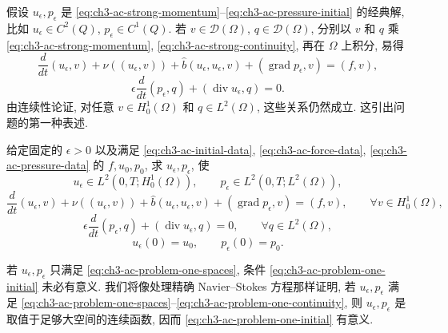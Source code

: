 \hypertarget{chapter-03-page-304}{}
假设 $u_\epsilon,p_\epsilon$ 是 \eqref{eq:ch3-ac-strong-momentum}--\eqref{eq:ch3-ac-pressure-initial} 的经典解, 比如 $u_\epsilon\in C^2(Q)$, $p_\epsilon\in C^1(Q)$. 若 $v\in\mathcal D(\Omega)$, $q\in\mathcal D(\Omega)$, 分别以 $v$ 和 $q$ 乘 \eqref{eq:ch3-ac-strong-momentum}, \eqref{eq:ch3-ac-strong-continuity}, 再在 $\Omega$ 上积分, 易得
\[
\frac d{dt}(u_\epsilon,v)+\nu((u_\epsilon,v))
+\widehat b(u_\epsilon,u_\epsilon,v)
+(\operatorname{grad}p_\epsilon,v)=(f,v),
\]
\[
\epsilon\frac d{dt}(p_\epsilon,q)+(\operatorname{div}u_\epsilon,q)=0.
\]
由连续性论证, 对任意 $v\in H_0^1(\Omega)$ 和 $q\in L^2(\Omega)$, 这些关系仍然成立. 这引出问题的第一种表述.

\MBProblemHeading\label{prob:ch3-ac-weak-formulation-one}
给定固定的 $\epsilon>0$ 以及满足 \eqref{eq:ch3-ac-initial-data}, \eqref{eq:ch3-ac-force-data}, \eqref{eq:ch3-ac-pressure-data} 的 $f,u_0,p_0$, 求 $u_\epsilon,p_\epsilon$, 使
\begin{equation}
u_\epsilon\in L^2(0,T;H_0^1(\Omega)),
\qquad p_\epsilon\in L^2(0,T;L^2(\Omega)),
\label{eq:ch3-ac-problem-one-spaces}
\end{equation}
\begin{equation}
\frac d{dt}(u_\epsilon,v)+\nu((u_\epsilon,v))
+\widehat b(u_\epsilon,u_\epsilon,v)
+(\operatorname{grad}p_\epsilon,v)=(f,v),
\qquad\forall v\in H_0^1(\Omega),
\label{eq:ch3-ac-problem-one-momentum}
\end{equation}
\begin{equation}
\epsilon\frac d{dt}(p_\epsilon,q)
+(\operatorname{div}u_\epsilon,q)=0,
\qquad\forall q\in L^2(\Omega),
\label{eq:ch3-ac-problem-one-continuity}
\end{equation}
\begin{equation}
u_\epsilon(0)=u_0,
\qquad p_\epsilon(0)=p_0.
\label{eq:ch3-ac-problem-one-initial}
\end{equation}

\begin{Remark}
\label{rem:ch3-ac-initial-values-well-defined}
若 $u_\epsilon,p_\epsilon$ 只满足 \eqref{eq:ch3-ac-problem-one-spaces}, 条件 \eqref{eq:ch3-ac-problem-one-initial} 未必有意义. 我们将像处理精确 Navier--Stokes 方程那样证明, 若 $u_\epsilon,p_\epsilon$ 满足 \eqref{eq:ch3-ac-problem-one-spaces}--\eqref{eq:ch3-ac-problem-one-continuity}, 则 $u_\epsilon,p_\epsilon$ 是取值于足够大空间的连续函数, 因而 \eqref{eq:ch3-ac-problem-one-initial} 有意义.
\end{Remark}

